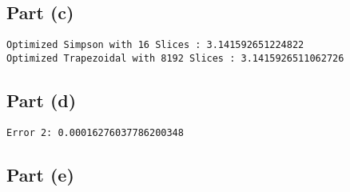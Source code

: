\documentclass[reprint, amsmath,amssymb, aps]{revtex4-2}
\begin{document}
\subsection{Part (c)}
\begin{lstlisting}[style=console]
Optimized Simpson with 16 Slices : 3.141592651224822
Optimized Trapezoidal with 8192 Slices : 3.1415926511062726
\end{lstlisting}
\subsection{Part (d)}

\begin{lstlisting}[style=console]
Error 2: 0.00016276037786200348
\end{lstlisting}
\subsection{Part (e)}

           
\end{document}
